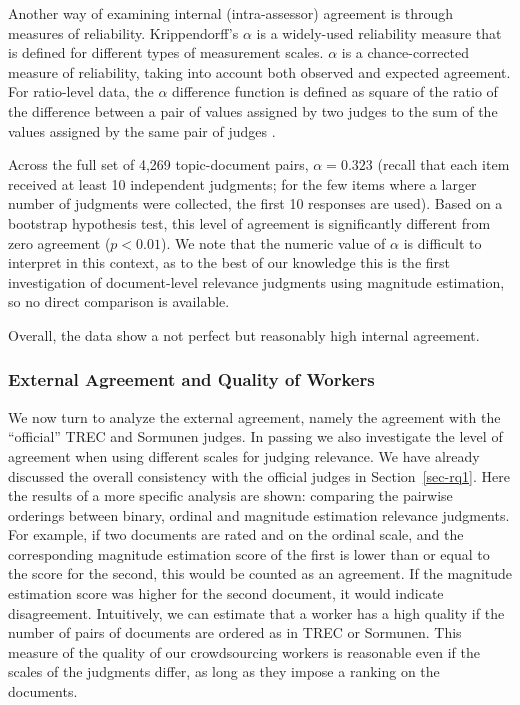 Another way of examining internal (intra-assessor) agreement is through
measures of reliability. Krippendorff's $\alpha$ \citep{HayKri07} is a
widely-used reliability measure that is defined for different types of
measurement scales.
$\alpha$ is a chance-corrected measure
of reliability, taking into account both observed and expected
agreement.
For ratio-level data, the $\alpha$ difference function is defined as
square of the ratio of the difference between a pair of values assigned
by two judges to
the sum of the values assigned by the same pair of judges \citep{Kri11}.

Across the full set of 4,269 topic-document pairs, $\alpha=0.323$
(recall that each item received at least 10 independent judgments; for
the few items where a larger number of judgments were collected, the
first 10 responses are used).
Based on a bootstrap hypothesis test, this level of agreement is
significantly different from zero agreement ($p<0.01$).
We note that the numeric value of $\alpha$ is difficult to interpret in
this context, as to the best of our knowledge this is the first
investigation of document-level relevance judgments using magnitude
estimation, so no direct comparison is available.

Overall, the data show a not perfect but reasonably high
internal agreement.

\subsubsection{External Agreement and Quality of Workers}
\label{sec:external-agreement}

We now turn to analyze the external agreement, namely the agreement
with the ``official'' TREC and Sormunen judges. 
In passing we also investigate the level of agreement when using
different scales for judging relevance. 
We have already discussed the overall consistency with the official
judges in Section~\ref{sec-rq1}. 
Here the results of a more specific analysis are shown: comparing the
pairwise orderings between binary, ordinal and magnitude estimation
relevance judgments.
For example, 
if two documents are rated \nn and \mm on the ordinal scale, 
and the corresponding
magnitude estimation score of the first is lower than or equal to the
score for the second, this would be counted as an agreement.
If the
magnitude estimation score was higher for the second document, it
would indicate disagreement.
Intuitively, we can estimate that a worker has a high quality if the
number of pairs of documents are ordered as in TREC or Sormunen.
This measure of the quality of our crowdsourcing workers is reasonable
even if the scales of the judgments differ, as long as they impose a
ranking on the documents. 

